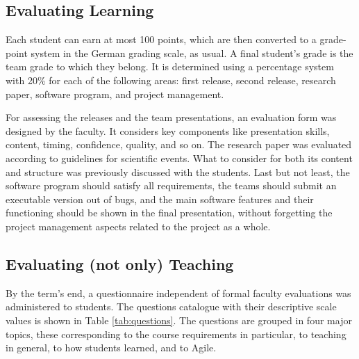 \documentclass[conference]{IEEEtran}
\begin{document}
\subsection{Evaluating Learning}
\label{sec:learneval}

Each student can earn at most 100 points, which are then converted to a grade-point system in the German grading scale, as usual. A final student's grade is the team grade to which they belong. It is determined using a percentage system with 20\% for each of the following areas: first release, second release, research paper, software program, and project management. 

For assessing the releases and the team presentations, an evaluation form was designed by the faculty. It considers key components like presentation skills, content, timing, confidence, quality, and so on. The research paper was evaluated according to guidelines for scientific events. What to consider for both its content and structure was previously discussed with the students. Last but not least, the software program should satisfy all requirements, the teams should submit an executable version out of bugs, and the main software features and their functioning should be shown in the final presentation, without forgetting the project management aspects related to the project as a whole.
 

\subsection{Evaluating (not only) Teaching}
\label{sec:teacheval}

By the term's end, a questionnaire independent of formal faculty evaluations was administered to students. The questions catalogue with their descriptive scale values is shown in Table \ref{tab:questions}. The questions are grouped in four major topics, these corresponding to the course requirements in particular, to teaching in general, to how students learned, and to Agile. 
\end{document}
